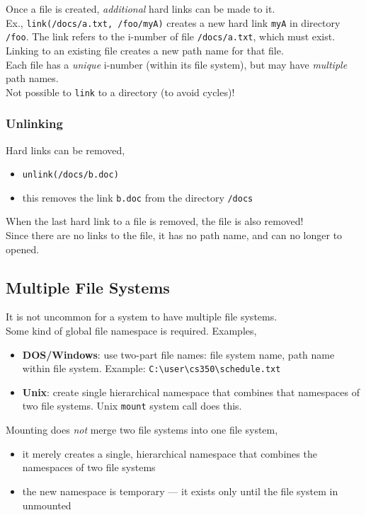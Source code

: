 \documentclass[12pt]{article}
\theoremstyle{plain}
\theoremstyle{definition}
\begin{document}
Once a file is created, \emph{additional} hard links can be made to it. \\
Ex., \texttt{link(/docs/a.txt, /foo/myA)} creates a new hard link \texttt{myA} in directory \texttt{/foo}.
The link refers to the i-number of file \texttt{/docs/a.txt}, which must exist. \\

Linking to an existing file creates a new path name for that file. \\
Each file has a \emph{unique} i-number (within its file system), but may have \emph{multiple} path names. \\

Not possible to \texttt{link} to a directory (to avoid cycles)!

\subsubsection{Unlinking}
Hard links can be removed,
\begin{itemize}
  \item \texttt{unlink(/docs/b.doc)}
  \item this removes the link \texttt{b.doc} from the directory \texttt{/docs}
\end{itemize}
When the last hard link to a file is removed, the file is also removed! \\
Since there are no links to the file, it has no path name, and can no longer to opened.

\subsection{Multiple File Systems}
It is not uncommon for a system to have multiple file systems. \\

Some kind of global file namespace is required.
Examples,
\begin{itemize}
  \item \textbf{DOS/Windows}: use two-part file names: file system name, path name within file system.
  Example: \texttt{C:\textbackslash user\textbackslash cs350\textbackslash schedule.txt}

  \item \textbf{Unix}: create single hierarchical namespace that combines that namespaces of two file systems.
  Unix \texttt{mount} system call does this.
\end{itemize}

Mounting does \emph{not} merge two file systems into one file system,
\begin{itemize}
  \item it merely creates a single, hierarchical namespace that combines the namespaces of two file systems
  \item the new namespace is temporary --- it exists only until the file system in unmounted
\end{itemize}
\end{document}
